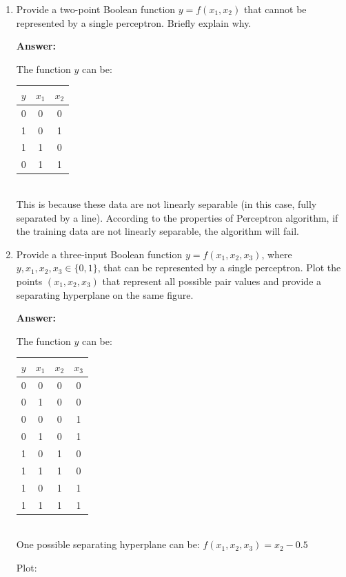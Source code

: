 \documentclass[paper=letter, fontsize=12pt]{article}
\begin{document}
\begin{enumerate}
\begin{enumerate}
	\item Provide a two-point Boolean function $y = f(x_1, x_2)$ that cannot be represented by a single perceptron. Briefly explain why.
	
	\textbf{Answer:}
	
	The function $y$ can be:
	
	\begin{tabular} {|c|c|c|}
		\hline
		$y$ & $x_1$ & $x_2$	\\ \hline
		0 & 0 & 0 \\ \hline
		1 & 0 & 1 \\ \hline
		1 & 1 & 0 \\ \hline
		0 & 1 & 1 \\ \hline
	\end{tabular} \\

	This is because these data are not linearly separable (in this case, fully separated by a line). According to the properties of Perceptron algorithm, if the training data are not linearly separable, the algorithm will fail.
	
	\item Provide a three-input Boolean function $y = f(x_1, x_2, x_3)$, where $y, x_1, x_2, x_3 \in \{0, 1\}$, that can be represented by a single perceptron. Plot the points $(x_1, x_2, x_3)$ that represent all possible pair values and provide a separating hyperplane on the same figure.
	
	\textbf{Answer:}
	
	The function $y$ can be:
	
	\begin{tabular} {|c|c|c|c|}
		\hline
		$y$ & $x_1$ & $x_2$	& $x_3$\\ \hline
		0 & 0 & 0 & 0\\ \hline
		0 & 1 & 0 & 0 \\ \hline
		0 & 0 & 0 & 1 \\ \hline
		0 & 1 & 0 & 1 \\ \hline
		1 & 0 & 1 & 0\\ \hline
		1 & 1 & 1 & 0 \\ \hline
		1 & 0 & 1 & 1 \\ \hline
		1 & 1 & 1 & 1 \\ \hline
	\end{tabular} \\

	One possible separating hyperplane can be: $f(x_1, x_2, x_3) = x_2 - 0.5$
	
	Plot:
	

\end{enumerate}
\end{enumerate}
\end{document}
